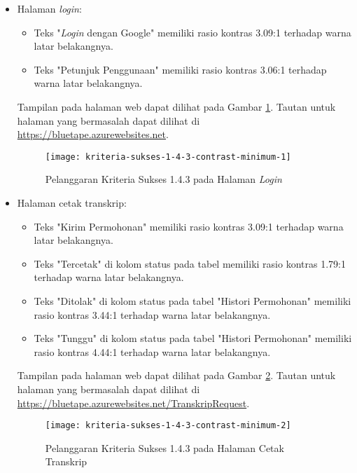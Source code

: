 \begin{itemize}
    \item Halaman \textit{login}: 
    \begin{itemize}
        \item Teks "\textit{Login} dengan Google" memiliki rasio kontras 3.09:1 terhadap warna latar belakangnya.
        \item Teks "Petunjuk Penggunaan" memiliki rasio kontras 3.06:1 terhadap warna latar belakangnya.
    \end{itemize}
    Tampilan pada halaman web dapat dilihat pada Gambar \ref{fig:1.4.3_contrast_minimum_1}. Tautan untuk halaman yang bermasalah dapat dilihat di \url{https://bluetape.azurewebsites.net}.
    \begin{figure}[H]
        \centering  
        \texttt{[image: kriteria-sukses-1-4-3-contrast-minimum-1]}  
        \caption[Pelanggaran Kriteria Sukses 1.4.3 pada Halaman \textit{Login}]{Pelanggaran Kriteria Sukses 1.4.3 pada Halaman \textit{Login}}
        \label{fig:1.4.3_contrast_minimum_1}  
    \end{figure} 
    
    \item Halaman cetak transkrip: 
    \begin{itemize}
        \item Teks "Kirim Permohonan" memiliki rasio kontras 3.09:1 terhadap warna latar belakangnya.
        \item Teks "Tercetak" di kolom status pada tabel memiliki rasio kontras 1.79:1 terhadap warna latar belakangnya.
        \item Teks "Ditolak" di kolom status pada tabel "Histori Permohonan" memiliki rasio kontras 3.44:1 terhadap warna latar belakangnya.
        \item Teks "Tunggu" di kolom status pada tabel "Histori Permohonan" memiliki rasio kontras 4.44:1 terhadap warna latar belakangnya.
    \end{itemize}   
    Tampilan pada halaman web dapat dilihat pada Gambar \ref{fig:1.4.3_contrast_minimum_2}. Tautan untuk halaman yang bermasalah dapat dilihat di \url{https://bluetape.azurewebsites.net/TranskripRequest}.
    \begin{figure}[H]
        \centering  
        \texttt{[image: kriteria-sukses-1-4-3-contrast-minimum-2]}  
        \caption[Pelanggaran Kriteria Sukses 1.4.3 pada Halaman Cetak Transkrip]{Pelanggaran Kriteria Sukses 1.4.3 pada Halaman Cetak Transkrip}
        \label{fig:1.4.3_contrast_minimum_2}  
    \end{figure} 
    

\end{itemize}

